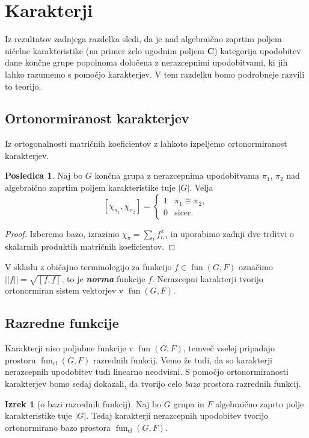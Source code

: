 \documentclass[11pt]{book}
\def\CC{\mathbf{C}}
\DeclareMathOperator\cl{cl}
\DeclareMathOperator\fun{fun}
\def\definicija{\color{rdeca}\bf\em}
\theoremstyle{definition}
\theoremstyle{zgled}
\theoremstyle{odprtproblem}
\theoremstyle{domacanaloga}
\newenvironment{dokaz}
    {\color{siva}\begin{proof}}
    {\end{proof}}
\theoremstyle{izrek}
\newtheorem*{izrek}{Izrek}
\newtheorem*{posledica}{Posledica}
\begin{document}
\section{Karakterji}

Iz rezultatov zadnjega razdelka sledi, da je nad algebraično zaprtim poljem ničelne karakteristike (na primer zelo ugodnim poljem $\CC$) kategorija upodobitev dane končne grupe popolnoma določena z nerazcepnimi upodobitvami, ki jih lahko razumemo s pomočjo karakterjev. V tem razdelku bomo podrobneje razvili to teorijo.

\subsection{Ortonormiranost karakterjev}

Iz ortogonalnosti matričnih koeficientov z lahkoto izpeljemo ortonormiranost karakterjev.

\begin{posledica}
Naj bo $G$ končna grupa z nerazcepnima upodobitvama $\pi_1$, $\pi_2$ nad algebraično zaprtim poljem karakteristike tuje $|G|$. Velja
\[
    [ \chi_{\pi_1}, \chi_{\pi_2} ] =
    \begin{cases}
        1 & \pi_1 \cong \pi_2, \\
        0 & \text{sicer.}
    \end{cases}
\]
\end{posledica}
\begin{dokaz}
Izberemo bazo, izrazimo $\chi_{\pi} = \sum_i f_{i,i}^{\pi}$ in uporabimo zadnji dve trditvi o skalarnih produktih matričnih koeficientov.
\end{dokaz}

V skladu z običajno terminologijo za funkcijo $f \in \fun(G,F)$ označimo $||f|| = \sqrt{[ f, f ]}$, to je {\definicija norma} funkcije $f$. Nerazcepni karakterji tvorijo ortonormiran sistem vektorjev v $\fun(G,F)$.

\subsection{Razredne funkcije}

Karakterji niso poljubne funkcije v $\fun(G,F)$, temveč vselej pripadajo prostoru $\fun_{\cl}(G,F)$ razrednih funkcij. Vemo že tudi, da so karakterji nerazcepnih upodobitev tudi linearno neodvisni. S pomočjo ortonormiranosti karakterjev bomo sedaj dokazali, da tvorijo celo \emph{bazo} prostora razrednih funkcij. 

\begin{izrek}[o bazi razrednih funkcij]
    Naj bo $G$ grupa in $F$ algebraično zaprto polje karakteristike tuje $|G|$. Tedaj karakterji nerazcepnih upodobitev tvorijo ortonormirano bazo prostora $\fun_{\cl}(G,F)$.
\end{izrek}
\end{document}
